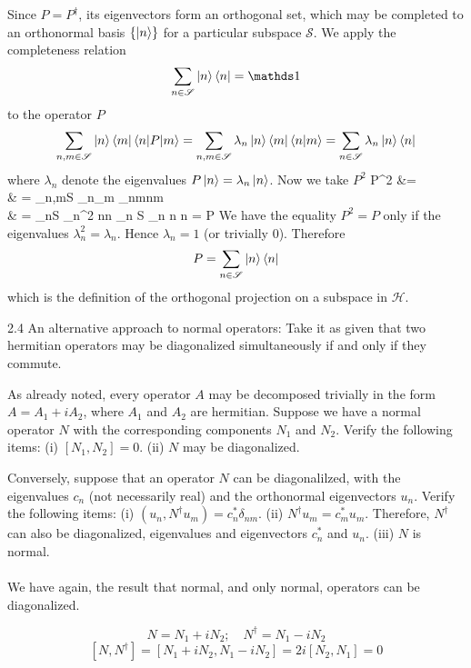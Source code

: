 \documentclass[10pt,letterpaper]{article}
\begin{document}
	Since $P=P^\dag$, its eigenvectors form an orthogonal set, which may be completed to an orthonormal
	basis $\{\ket n\}$ for a particular subspace $\mathscr S$. We apply the completeness relation
	\[
		\sum_{n \in \mathscr S} \ket n \bra n = \mathds 1
	\]
	to the operator $P$
	\[
		\sum_{n,m \in \mathscr S} \ket n \bra m \braket{n|P|m} = \sum_{n,m \in \mathscr S} \lambda_n
		\ket n \bra m \braket{n|m} = \sum_{n \in \mathscr S} \lambda_n
		\ket n \bra n
	\]
	where $\lambda_n$ denote the eigenvalues $P\ket n = \lambda_n \ket n$. Now we take $P^2$
	\ba
		P^2 &= 
		 \\
		& = \sum_{n,m\in\mathscr S} \lambda_n\lambda_m \delta_{nm}\ket n\bra m \\
		& = \sum_{n\in \mathscr S} \lambda_n^2 \ket n\bra n \overset{!}{=} 
		\sum_{n \in \mathscr S} \lambda_n \ket n \bra n = P
	\ea
	We have the equality $P^2 = P$ only if the eigenvalues $\lambda^2_n = \lambda_n$. Hence $\lambda_n = 1$
	(or trivially $0$). Therefore
	\[
		P = \sum_{n\in \mathscr S} \ket n\bra n
	\]
	which is the definition of the orthogonal projection on a subspace in $\mathscr H$. 
	 \\
	
	\item[2.4]
	An alternative approach to normal operators: Take it as given that two hermitian operators may be diagonalized
	simultaneously if and only if they commute.
	\benum
	\item
	As already noted, every operator $A$ may be decomposed trivially in the form $A = A_1+iA_2$,
	where $A_1$ and $A_2$ are hermitian. Suppose we have a normal operator $N$ with the 
	corresponding components $N_1$ and $N_2$. Verify the following items: (i) $[N_1,N_2] = 0$. 
	(ii) $N$ may be diagonalized.
	\item
	Conversely, suppose that an operator $N$ can be diagonalilzed, with the eigenvalues $c_n$ (not necessarily
	real) and the orthonormal eigenvectors $u_n$. Verify the following items: (i) $(u_n,N^\dag u_m) = 
	c_n^*\delta_{nm}$. (ii) $N^\dag u_m = c_m^* u_m$. Therefore, $N^\dag$ can also be diagonalized, eigenvalues
	and eigenvectors $c_n^*$ and $u_n$. (iii) $N$ is normal.
	\\ \\
	We have again, the result that normal, and only normal, operators can be diagonalized.
	\eenum 
	\benum
	\item
	\[
		N = N_1+iN_2;\quad N^\dag = N_1-iN_2
	\]
	\[
		[N,N^\dag] = [N_1+iN_2,N_1-iN_2] = 2i[N_2,N_1] = 0
	\]
	
\end{document}
